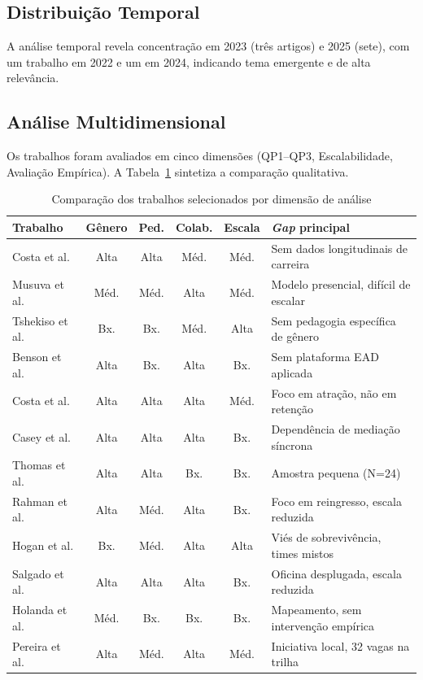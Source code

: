 \documentclass[12pt]{article}
\begin{document}
\subsection{Distribuição Temporal}

A análise temporal revela concentração em 2023 (três artigos) e 2025 (sete), com um trabalho em 2022 e um em 2024, indicando tema emergente e de alta relevância.

\subsection{Análise Multidimensional}

Os trabalhos foram avaliados em cinco dimensões (QP1--QP3, Escalabilidade, Avaliação Empírica). A Tabela~\ref{tab:comparacao} sintetiza a comparação qualitativa.

\begin{table}[H]
\centering
\caption{Comparação dos trabalhos selecionados por dimensão de análise}
\label{tab:comparacao}
\begin{tabular}{l|c|c|c|c|l}
\toprule
\textbf{Trabalho} & \textbf{Gênero} & \textbf{Ped.} & \textbf{Colab.} & \textbf{Escala} & \textbf{\textit{Gap} principal} \\
\midrule
Costa et al.    & Alta  & Alta  & Méd. & Méd. & Sem dados longitudinais de carreira \\
Musuva et al.  & Méd.  & Méd.  & Alta & Méd. & Modelo presencial, difícil de escalar \\
Tshekiso et al. & Bx. & Bx.  & Méd. & Alta & Sem pedagogia específica de gênero \\
Benson et al.  & Alta  & Bx.   & Alta & Bx.  & Sem plataforma EAD aplicada \\
Costa et al.    & Alta  & Alta  & Alta & Méd. & Foco em atração, não em retenção \\
Casey et al.    & Alta  & Alta  & Alta & Bx.  & Dependência de mediação síncrona \\
Thomas et al.  & Alta  & Alta  & Bx.  & Bx.  & Amostra pequena (N=24) \\
Rahman et al.  & Alta  & Méd.  & Alta & Bx.  & Foco em reingresso, escala reduzida \\
Hogan et al.    & Bx.   & Méd.  & Alta & Alta & Viés de sobrevivência, times mistos \\
Salgado et al. & Alta  & Alta  & Alta & Bx.  & Oficina desplugada, escala reduzida \\
Holanda et al. & Méd.  & Bx.   & Bx.  & Bx.  & Mapeamento, sem intervenção empírica \\
Pereira et al. & Alta  & Méd.  & Alta & Méd. & Iniciativa local, 32 vagas na trilha \\
\bottomrule
\end{tabular}
\end{table}
\end{document}
